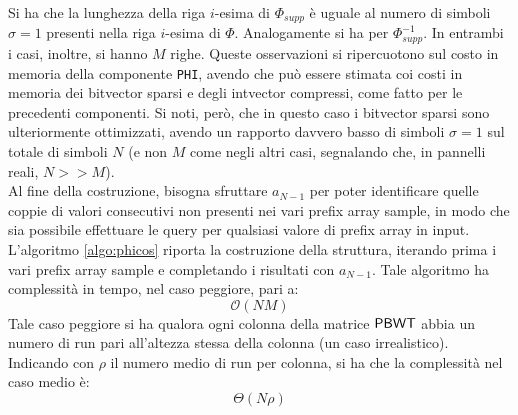 Si ha che la lunghezza della riga $i$-esima di $\varPhi_{supp}$ è
uguale al numero di simboli $\sigma=1$ presenti nella riga $i$-esima di
$\varPhi$. Analogamente 
si ha per $\varPhi^{-1}_{supp}$. In entrambi i casi, inoltre, si hanno $M$
righe. Queste osservazioni si ripercuotono sul costo in memoria della componente
\texttt{PHI}, avendo che può essere stimata coi costi in memoria dei bitvector
sparsi e degli intvector compressi, come fatto per le precedenti componenti. Si
noti, però, che in questo caso i bitvector sparsi sono ulteriormente
ottimizzati,
avendo un rapporto davvero basso di simboli $\sigma=1$ sul totale di
simboli $N$ (e non $M$
come negli altri casi, segnalando che, in pannelli reali, $N>>M$).\\ 
Al fine della costruzione, bisogna sfruttare $a_{N-1}$ per poter
identificare quelle coppie di valori consecutivi non presenti nei vari
prefix array sample, in modo che sia possibile effettuare le query per
qualsiasi valore di prefix array in input.\\
L'algoritmo \ref{algo:phicos} riporta la costruzione della struttura,
iterando prima i vari prefix array sample e completando i
risultati con $a_{N-1}$. Tale algoritmo ha complessità in tempo, nel caso
peggiore, pari a:
\begin{equation}
  \label{eq:phicos}
  \mathcal{O}(NM)
\end{equation}
Tale caso peggiore si ha qualora ogni colonna della matrice $\mbox{\rm {\sf PBWT}}$ abbia un
numero di 
run pari all'altezza stessa della colonna (un caso irrealistico). Indicando con
$\rho$ il numero medio 
di run per colonna, si ha che la complessità nel caso medio è:
\begin{equation}
  \label{eq:phicos2}
  \varTheta(N\rho)
\end{equation}
